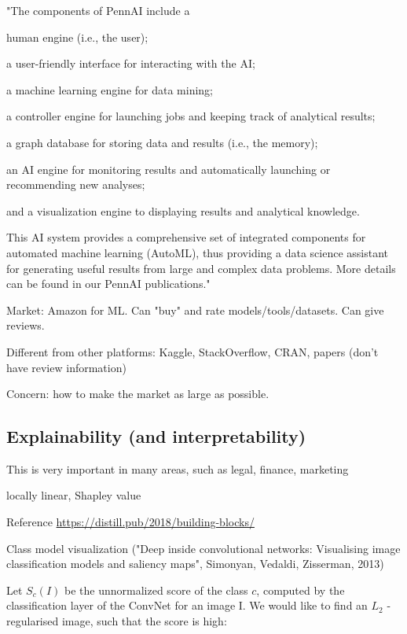 \documentclass[english]{article}
\begin{document}
\item "The components of PennAI include a 

human engine (i.e., the user); 

a user-friendly interface for interacting with the AI; 

a machine learning engine for data mining; 

a controller engine for launching jobs and keeping track of analytical results; 

a graph database for storing data and results (i.e., the memory); 

an AI engine for monitoring results and automatically launching or recommending new analyses; 

and a visualization engine to displaying results and analytical knowledge. 

This AI system provides a comprehensive set of integrated components for automated machine learning (AutoML), thus providing a data science assistant for generating useful results from large and complex data problems. More details can be found in our PennAI publications."

\item Market: Amazon for ML. Can "buy" and rate models/tools/datasets. Can give reviews. 

Different from other platforms: Kaggle, StackOverflow, CRAN, papers (don't have review information)

Concern: how to make the market as large as possible.  

\eenum 


\subsection{Explainability (and interpretability)}


\benum 
\item This is very important in many areas, such as legal, finance, marketing

locally linear, Shapley value


\item Reference \url{https://distill.pub/2018/building-blocks/}


\item Class model visualization ("Deep inside convolutional networks: Visualising image classification models and saliency maps", Simonyan, Vedaldi, Zisserman, 2013)

Let $S_c(I)$ be the unnormalized score of the class $c$, computed by the classification layer of the ConvNet for an image I. We would like to find an $L_2$  - regularised image, such that the score is
high:
\end{document}
